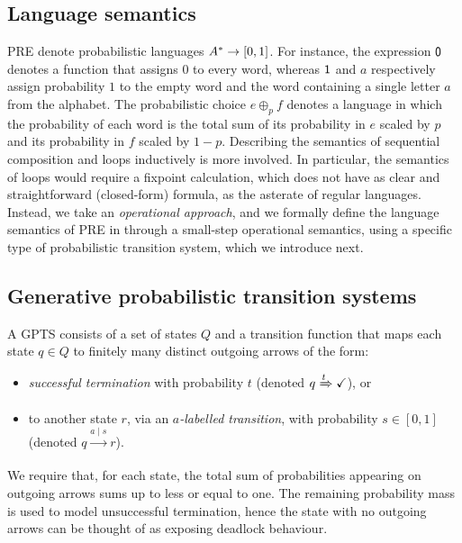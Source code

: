 \subsection{Language semantics}
{PRE} denote probabilistic languages $\alphabet^\ast \to \interval{0}{1}$. For instance, the expression $\mathsf{0}$ denotes a function that assigns $0$ to every word, whereas $\mathsf{1}$ and $a$ respectively assign probability $1$ to the empty word and the word containing a single letter $a$ from the alphabet. The probabilistic choice $e \oplus_p f$ denotes a language in which the probability of each word is the total sum of its probability in $e$ scaled by $p$ and its probability in $f$ scaled by $1-p$. Describing the semantics of sequential composition and loops inductively is more involved. In particular, the semantics of loops would require a fixpoint calculation, which does not have as clear and straightforward (closed-form) formula, as the asterate of regular languages. Instead, we take an \emph{operational approach}, and we formally define the language semantics of {PRE} in  through a small-step operational semantics, using a specific type of probabilistic transition system, which we introduce next.

\subsection{Generative probabilistic transition systems}
A {GPTS} consists of a set of states $Q$ and a transition function that maps each state $q\in Q$ to finitely many distinct outgoing arrows of the form:
\begin{itemize}
    \item \emph{successful termination} with probability $t$ (denoted $q \xRightarrow[]{t} \checkmark$), or 
    \item to another state $r$, via an \emph{$a$-labelled transition}, with probability $s \in [0,1] $ (denoted $q \xrightarrow[]{a \mid s} r$).
\end{itemize} 
We require that, for each state, the total sum of probabilities appearing on outgoing arrows sums up to less or equal to one. The remaining probability mass is used to model unsuccessful termination, hence the state with no outgoing arrows can be thought of as exposing deadlock behaviour. 

